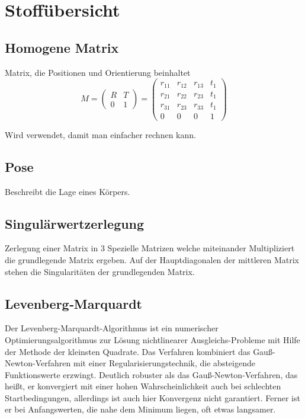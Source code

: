 \chapter{Stoffübersicht}
\label{uebersichtStoffübersicht}

\section{Homogene Matrix}	
\label{uebersicht:sec:homogeneMatrix}
	Matrix, die Positionen und Orientierung beinhaltet 
	\begin{equation}
	M = 
	\left(
	\begin{array}{cc}
	R & T\\
	0 & 1
	\end{array}
	\right)
	=
	\left(
	\begin{array}{cccc}
	r_{11} & r_{12} & r_{13} & t_{1} \\
	r_{21} & r_{22} & r_{23} & t_{1} \\
	r_{31} & r_{23} & r_{33} & t_{1} \\
	0 	   & 0    & 0    & 1  
	\end{array}
	\right)	
	\end{equation}
	
	Wird verwendet, damit man einfacher rechnen kann.

\section{Pose}	
\label{uebersicht:sec:pose}
Beschreibt die Lage eines Körpers.


\section{Singulärwertzerlegung}	
\label{uebersicht:sec:singulärwertzerlegung}
Zerlegung einer Matrix in 3 Spezielle Matrizen welche miteinander Multipliziert die grundlegende Matrix ergeben. Auf der Hauptdiagonalen der mittleren Matrix stehen die Singularitäten der grundlegenden Matrix. 
	
	
\section{Levenberg‐Marquardt}
\label{uebersicht:sec:Levenberg‐Marquardt}
	Der Levenberg-Marquardt-Algorithmus ist ein numerischer Optimierungsalgorithmus zur Lösung nichtlinearer Ausgleichs-Probleme mit
	Hilfe der Methode der kleinsten Quadrate. Das Verfahren kombiniert das Gauß-Newton-Verfahren mit einer Regularisierungstechnik, die
	absteigende Funktionswerte erzwingt. Deutlich robuster als das Gauß-Newton-Verfahren, das heißt, er konvergiert mit einer hohen
	Wahrscheinlichkeit auch bei schlechten Startbedingungen, allerdings ist auch hier Konvergenz nicht garantiert. Ferner ist er bei
	Anfangswerten, die nahe dem Minimum liegen, oft etwas langsamer. 
	
